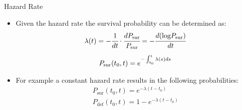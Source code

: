 \documentclass{beamer}
\begin{document}
\begin{frame}{Hazard Rate}
	\begin{itemize}
		\item Given the hazard rate the survival probability can be determined as:
		\begin{gather*}
		\lambda(t) = -\cfrac{1}{dt}\cdot\cfrac{dP_{\textrm{sur}}}{P_{\textrm{sur}}} = -\cfrac{d(\textrm{log}P_{\textrm{sur}})}{dt}\\[5pt]
		P_{\textrm{sur}}(t_0, t) = e^{-\int_{t_0}^{t}\lambda(s) ds}
		\end{gather*}
		
		\item For example a constant hazard rate results in the following probabilities:
		\begin{gather*}
			P_{\textrm{sur}}(t_0, t) = e^{-\lambda (t-t_0)}\\
			P_{\textrm{def}}(t_0, t) = 1 - e^{-\lambda (t-t_0)}
		\end{gather*}
	\end{itemize}
\end{frame}
\end{document}
